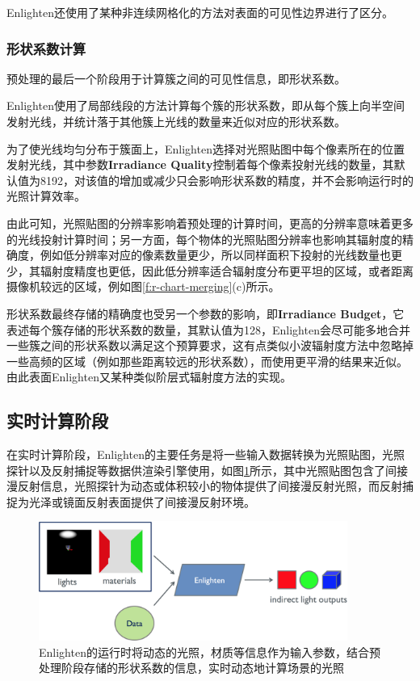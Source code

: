 Enlighten还使用了某种非连续网格化的方法对表面的可见性边界进行了区分。




\subsubsection{形状系数计算}
预处理的最后一个阶段用于计算簇之间的可见性信息，即形状系数。

Enlighten使用了局部线段的方法计算每个簇的形状系数，即从每个簇上向半空间发射光线，并统计落于其他簇上光线的数量来近似对应的形状系数。

为了使光线均匀分布于簇面上，Enlighten选择对光照贴图中每个像素所在的位置发射光线，其中参数\textbf{Irradiance Quality}控制着每个像素投射光线的数量，其默认值为8192，对该值的增加或减少只会影响形状系数的精度，并不会影响运行时的光照计算效率。

由此可知，光照贴图的分辨率影响着预处理的计算时间，更高的分辨率意味着更多的光线投射计算时间；另一方面，每个物体的光照贴图分辨率也影响其辐射度的精确度，例如低分辨率对应的像素数量更少，所以同样面积下投射的光线数量也更少，其辐射度精度也更低，因此低分辨率适合辐射度分布更平坦的区域，或者距离摄像机较远的区域，例如图\ref{f:r-chart-merging}(c)所示。

形状系数最终存储的精确度也受另一个参数的影响，即\textbf{Irradiance Budget}，它表述每个簇存储的形状系数的数量，其默认值为128，Enlighten会尽可能多地合并一些簇之间的形状系数以满足这个预算要求，这有点类似小波辐射度方法中忽略掉一些高频的区域（例如那些距离较远的形状系数），而使用更平滑的结果来近似。由此表面Enlighten又某种类似阶层式辐射度方法的实现。




\subsection{实时计算阶段}
在实时计算阶段，Enlighten的主要任务是将一些输入数据转换为光照贴图，光照探针以及反射捕捉等数据供渲染引擎使用，如图\ref{f:r-enlighten-runtime}所示，其中光照贴图包含了间接漫反射信息，光照探针为动态或体积较小的物体提供了间接漫反射光照，而反射捕捉为光泽或镜面反射表面提供了间接漫反射环境。

 \begin{figure}
	\begin{center}
		\includegraphics[width=0.9\textwidth]{figures/r/path-29-2}
	\end{center}
	\caption{Enlighten的运行时将动态的光照，材质等信息作为输入参数，结合预处理阶段存储的形状系数的信息，实时动态地计算场景的光照}
	\label{f:r-enlighten-runtime}
\end{figure}

